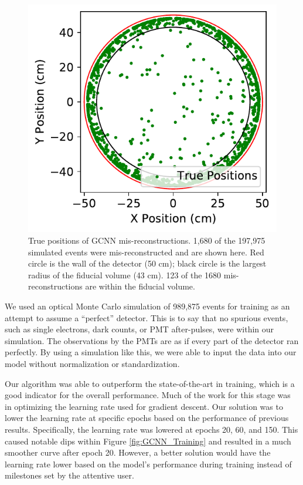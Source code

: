 \documentclass[thesis.tex]{subfiles}
\begin{document}
\begin{figure}
	\centering
	\includegraphics[width=\linewidth]{figures/gcnn_Delaunay-Prenoise_1cm-err.pdf}
	\caption{
	True positions of GCNN mis-reconstructions.
	1,680 of the 197,975 simulated events were mis-reconstructed and are shown here.
	Red circle is the wall of the detector (50 cm); black circle is the largest radius of the fiducial volume (43 cm).
	123 of the 1680 mis-reconstructions are within the fiducial volume.
	}
	\label{fig:1cm_Counts}
\end{figure}

\par We used an optical Monte Carlo simulation of 989,875 events for training as an attempt to assume a “perfect” detector.
This is to say that no spurious events, such as single electrons, dark counts, or PMT after-pulses, were within our simulation.
The observations by the PMTs are as if every part of the detector ran perfectly.
By using a simulation like this, we were able to input the data into our model without normalization or standardization.

\par Our algorithm was able to outperform the state-of-the-art in training, which is a good indicator for the overall performance.
Much of the work for this stage was in optimizing the learning rate used for gradient descent.
Our solution was to lower the learning rate at specific epochs based on the performance of  previous results.
Specifically, the learning rate was lowered at epochs 20, 60, and 150.
This caused notable dips within Figure \ref{fig:GCNN_Training} and resulted in a much smoother curve after epoch 20.
However, a better solution would have the learning rate lower based on the model's performance during training instead of milestones set by the attentive user.
\end{document}
